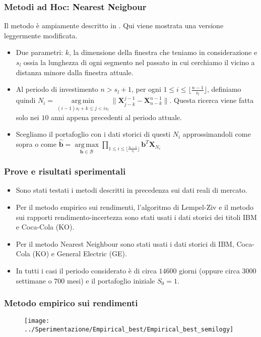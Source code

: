 \documentclass{beamer}
\theoremstyle{plain}
\theoremstyle{definition}
\theoremstyle{remark}
\newcommand{\X}{\bm{X}}
\newcommand{\B}{\bm{b}}
\DeclareMathOperator*{\argmax}{arg\,max}
\DeclareMathOperator*{\argmin}{arg\,min}
\begin{document}
\begin{frame}
\frametitle{Metodi ad Hoc: Nearest Neigbour}
Il metodo è ampiamente descritto in \cite{NN}. Qui viene mostrata una versione leggermente modificata.
\begin{itemize}
\item Due parametri: $k$, la dimensione della finestra che teniamo in considerazione e $s_l$ ossia la lunghezza di ogni segmento nel passato in cui cerchiamo il vicino a distanza minore dalla finestra attuale.
\item Al periodo di investimento $n>s_l+1$, per ogni $1\leq i\leq \lfloor \frac{n-1}{s_l}\rfloor$, definiamo quindi $N_i = \argmin\limits_{(i-1)s_l+k\leq j < is_l}{\| \X_{j-k}^{j-1}-\X_{n-k}^{n-1}\|}$. Questa ricerca viene fatta solo nei $10$ anni appena precedenti al periodo attuale.
\item Scegliamo il portafoglio con i dati storici di questi $N_i$ approssimandoli come sopra o come $\hat{\B} = \argmax\limits_{\B\in \mathcal{B}}\prod_{1\leq i\leq \lfloor \frac{n-1}{s_l}\rfloor}{\B^T\X_{N_i}}$
\end{itemize}

\end{frame}

\begin{frame}
\frametitle{Prove e risultati sperimentali}
\begin{itemize}
\item Sono stati testati i metodi descritti in precedenza sui dati reali di mercato.
\item Per il metodo empirico sui rendimenti, l'algoritmo di Lempel-Ziv e il metodo sui rapporti rendimento-incertezza sono stati usati i dati storici dei titoli IBM e Coca-Cola (KO).
\item Per il metodo Nearest Neighbour sono stati usati i dati storici di IBM, Coca-Cola (KO) e General Electric (GE).
\item In tutti i casi il periodo considerato è di circa $14600$ giorni (oppure circa $3000$ settimane o $700$ mesi) e il portafoglio iniziale $S_0=1$.
\end{itemize}
\end{frame}

\begin{frame}
\frametitle{Metodo empirico sui rendimenti}
\begin{figure}
\centering
\texttt{[image: ../Sperimentazione/Empirical\_best/Empirical\_best\_semilogy]}
\caption{}
\label{fig:empiricalbestsemilogy}
\end{figure}

\end{frame}
\end{document}
